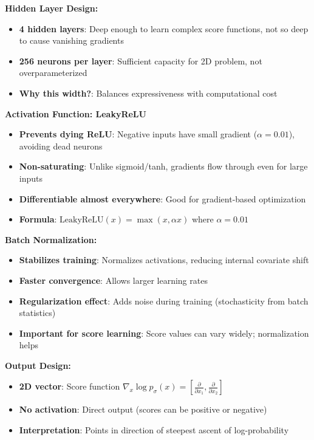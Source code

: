 \documentclass[journal]{IEEEtran}
\begin{document}
\textbf{Hidden Layer Design:}
\begin{itemize}
    \item \textbf{4 hidden layers}: Deep enough to learn complex score functions, not so deep to cause vanishing gradients
    \item \textbf{256 neurons per layer}: Sufficient capacity for 2D problem, not overparameterized
    \item \textbf{Why this width?}: Balances expressiveness with computational cost
\end{itemize}

\textbf{Activation Function: LeakyReLU}
\begin{itemize}
    \item \textbf{Prevents dying ReLU}: Negative inputs have small gradient ($\alpha = 0.01$), avoiding dead neurons
    \item \textbf{Non-saturating}: Unlike sigmoid/tanh, gradients flow through even for large inputs
    \item \textbf{Differentiable almost everywhere}: Good for gradient-based optimization
    \item \textbf{Formula}: $\text{LeakyReLU}(x) = \max(x, \alpha x)$ where $\alpha = 0.01$
\end{itemize}

\textbf{Batch Normalization:}
\begin{itemize}
    \item \textbf{Stabilizes training}: Normalizes activations, reducing internal covariate shift
    \item \textbf{Faster convergence}: Allows larger learning rates
    \item \textbf{Regularization effect}: Adds noise during training (stochasticity from batch statistics)
    \item \textbf{Important for score learning}: Score values can vary widely; normalization helps
\end{itemize}

\textbf{Output Design:}
\begin{itemize}
    \item \textbf{2D vector}: Score function $\nabla_x \log p_\sigma(x) = [\frac{\partial}{\partial x_1}, \frac{\partial}{\partial x_2}]$
    \item \textbf{No activation}: Direct output (scores can be positive or negative)
    \item \textbf{Interpretation}: Points in direction of steepest ascent of log-probability
\end{itemize}
\end{document}
